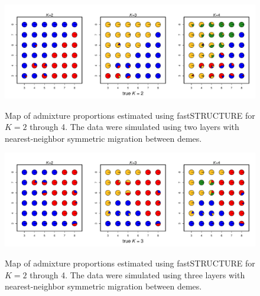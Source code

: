 \documentclass[10pt,letterpaper]{article}
\begin{document}
\begin{figure}
	\centering
		{\includegraphics[width=\textwidth]{figs/fastStr/fastStr_simK2_pies.pdf}}
	\caption{
	Map of admixture proportions estimated using fastSTRUCTURE \cite{fastStructure} for $K=2$ through 4.
	The data were simulated using two layers with nearest-neighbor symmetric migration between demes.
    }\label{fastStr_simK2}
\end{figure}
\clearpage

\begin{figure}
	\centering
		{\includegraphics[width=\textwidth]{figs/fastStr/fastStr_simK3_pies.pdf}}
	\caption{
	Map of admixture proportions estimated using fastSTRUCTURE \cite{fastStructure} for $K=2$ through 4.
	The data were simulated using three layers with nearest-neighbor symmetric migration between demes.
    }\label{fastStr_simK3}
\end{figure}
\clearpage
\end{document}
